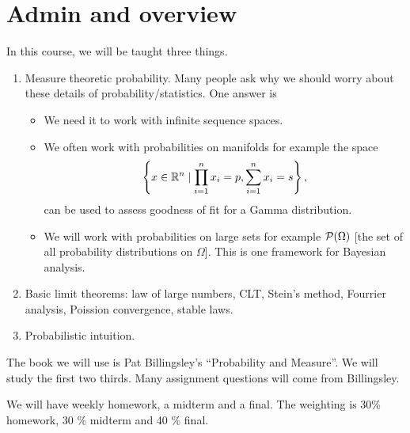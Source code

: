 \section{Admin and overview}
In this course, we will be taught three things.
\begin{enumerate}
    \item Measure theoretic probability. Many people ask why we should worry about these details of probability/statistics. One answer is
    \begin{itemize}
        \item We need it to work with infinite sequence spaces.
        \item We often work with probabilities on manifolds for example the space \[\left\{x \in {\mathbb R}^n \mid \prod_{i=1}^n x_i = p, \sum_{i=1}^n x_i = s \right\},\]
        can be used to assess goodness of fit for a Gamma distribution.
        \item We will work with probabilities on large sets for example ${\mathcal{P}}(\Omega)$ [the set of all probability distributions on $\Omega$]. This is one framework for Bayesian analysis.
    \end{itemize}
    \item Basic limit theorems: law of large numbers, CLT, Stein's method, Fourrier analysis, Poission convergence, stable laws.
    \item Probabilistic intuition.
\end{enumerate}

The book we will use is Pat Billingsley's ``Probability and Measure''. We will study the first two thirds. Many assignment questions will come from Billingsley.  

We will have weekly homework, a midterm and a final. The weighting is 30\% homework, 30 \% midterm and 40 \% final.

